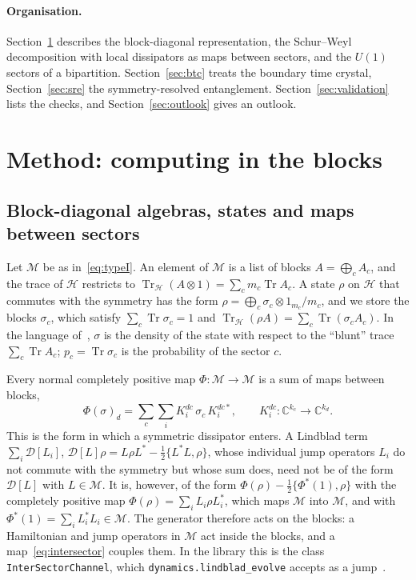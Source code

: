 \documentclass[11pt]{article}
\DeclareMathOperator{\Tr}{Tr}
\newcommand{\C}{\mathbb{C}}
\newcommand{\M}{\mathcal{M}}
\newcommand{\D}{\mathcal{D}}
\newcommand{\code}[1]{\nolinkurl{#1}}
\begin{document}
\paragraph{Organisation.} Section~\ref{sec:method} describes the block-diagonal representation, the Schur--Weyl
decomposition with local dissipators as maps between sectors, and the $U(1)$ sectors of a bipartition.
Section~\ref{sec:btc} treats the boundary time crystal, Section~\ref{sec:sre} the symmetry-resolved entanglement.
Section~\ref{sec:validation} lists the checks, and Section~\ref{sec:outlook} gives an outlook.

\section{Method: computing in the blocks}\label{sec:method}

\subsection{Block-diagonal algebras, states and maps between sectors}\label{sec:typeI}

Let $\M$ be as in~\eqref{eq:typeI}. An element of $\M$ is a list of blocks $A=\bigoplus_cA_c$, and the trace of
$\mathcal H$ restricts to $\Tr_{\mathcal H}(A\otimes1)=\sum_cm_c\Tr A_c$. A state $\rho$ on $\mathcal H$ that commutes
with the symmetry has the form $\rho=\bigoplus_c\sigma_c\otimes1_{m_c}/m_c$, and we store the blocks $\sigma_c$, which
satisfy $\sum_c\Tr\sigma_c=1$ and $\Tr_{\mathcal H}(\rho A)=\sum_c\Tr(\sigma_cA_c)$. In the language of~\cite{lib},
$\sigma$ is the density of the state with respect to the ``blunt'' trace $\sum_c\Tr A_c$; $p_c=\Tr\sigma_c$ is the
probability of the sector $c$.

Every normal completely positive map $\Phi:\M\to\M$ is a sum of maps between blocks,
\begin{equation}\label{eq:intersector}
  \Phi(\sigma)_d=\sum_c\sum_iK^{dc}_i\,\sigma_c\,K^{dc*}_i,\qquad K^{dc}_i:\C^{k_c}\to\C^{k_d}.
\end{equation}
This is the form in which a symmetric dissipator enters. A Lindblad term $\sum_i\D[L_i]$, $\D[L]\rho=L\rho L^*-\frac12\{L^*L,\rho\}$, whose individual
jump operators $L_i$ do not commute with the symmetry but whose sum does, need not be of the form $\D[L]$ with $L\in\M$.
It is, however, of the form $\Phi(\rho)-\frac12\{\Phi^*(1),\rho\}$ with the completely positive map
$\Phi(\rho)=\sum_iL_i\rho L_i^*$, which maps $\M$ into $\M$, and with $\Phi^*(1)=\sum_iL_i^*L_i\in\M$. The generator
therefore acts on the blocks: a Hamiltonian and jump operators in $\M$ act inside the blocks, and a map~\eqref{eq:intersector}
couples them. In the library this is the class \code{InterSectorChannel}, which \code{dynamics.lindblad_evolve} accepts
as a jump~\cite{lib}.
\end{document}
